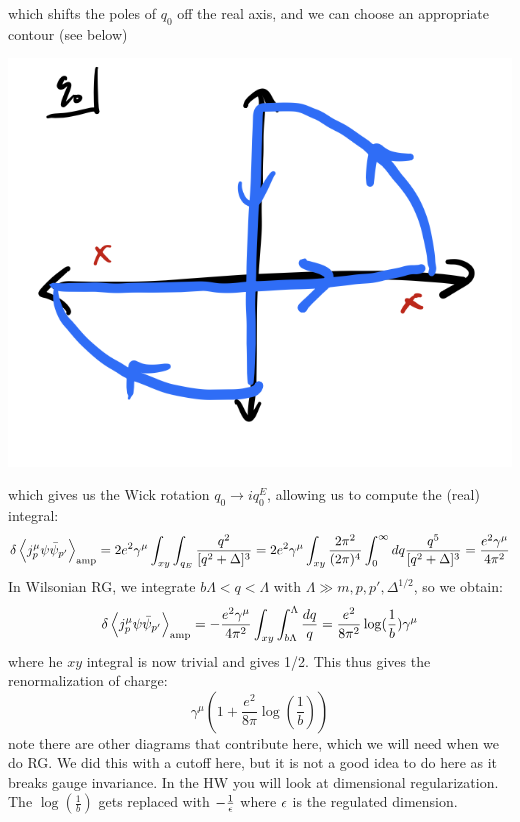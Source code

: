 which shifts the poles of $q_0$ off the real axis, and we can choose an appropriate contour (see below)
\begin{center}
    \includegraphics[scale=0.35]{Lectures/Images/lec10-contour.png}
\end{center}
which gives us the Wick rotation $q_0 \to iq_0^E$, allowing us to compute the (real) integral:
\begin{equation}
    \delta \left< j^\mu_p \psi \bar{\psi}_{p'} \right>_{\text{amp}} = 2e^2\gamma^\mu \int_{xy}\int_{q_E}\frac{q^2}{[q^2 + \Delta]^3} = 2e^2\gamma^\mu \int_{xy}\frac{2\pi^2}{(2\pi)^4}\int_0^\infty dq \frac{q^5}{[q^2 + \Delta]^3} = \frac{e^2\gamma^\mu}{4\pi^2}
\end{equation}
In Wilsonian RG, we integrate $b\Lambda < q < \Lambda$ with $\Lambda \gg m, p, p', \Delta^{1/2}$, so we obtain:
\begin{equation}
    \delta \left< j^\mu_p \psi \bar{\psi}_{p'} \right>_{\text{amp}} = -\frac{e^2\gamma^\mu}{4\pi^2}\int_{xy}\int_{b\Lambda}^\Lambda \frac{dq}{q} = \frac{e^2}{8\pi^2}\log(\frac{1}{b})\gamma^\mu
\end{equation}
where he $xy$ integral is now trivial and gives 1/2. This thus gives the renormalization of charge:
\begin{equation}
    \gamma^\mu(1 + \frac{e^2}{8\pi}\log(\frac{1}{b}))
\end{equation}
note there are other diagrams that contribute here, which we will need when we do RG. We did this with a cutoff here, but it is not a good idea to do here as it breaks gauge invariance. In the HW you will look at dimensional regularization. The $\log(\frac{1}{b})$ gets replaced with $-\frac{1}{\epsilon}$ where $\epsilon$ is the regulated dimension.

